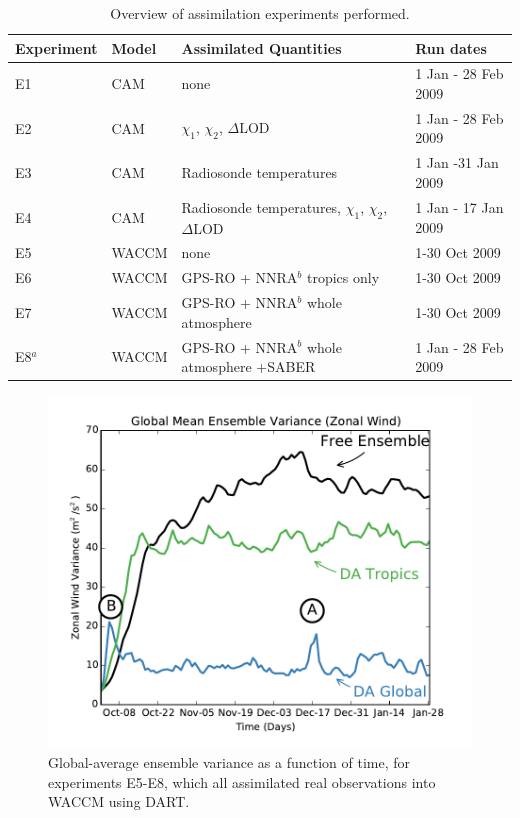 \begin{table}
\caption{Overview of assimilation experiments performed.}
\centering
\begin{tabular}{p{2cm}p{2cm}p{6cm}p{4cm}}
	Experiment& Model &  Assimilated Quantities  & Run dates \\
\hline
E1 & CAM	&	none &  1 Jan - 28 Feb 2009 \\
E2 & CAM &	$\chi_1$, $\chi_2$, $\Delta$LOD	& 1 Jan - 28 Feb 2009 \\
E3 & CAM &	Radiosonde temperatures	& 1 Jan -31 Jan 2009	\\
E4 & CAM &	Radiosonde temperatures, $\chi_1$, $\chi_2$, $\Delta$LOD	& 1 Jan - 17 Jan 2009\\
E5 & WACCM &	none   & 1-30 Oct 2009	\\
E6 & WACCM &	GPS-RO + NNRA$^b$ tropics only & 1-30 Oct 2009	\\
E7 & WACCM &	GPS-RO + NNRA$^b$ whole atmosphere  & 1-30 Oct 2009	\\
E8$^a$ & WACCM &	GPS-RO + NNRA$^b$ whole atmosphere +SABER & 1 Jan - 28 Feb 2009\\	
\hline
\end{tabular}
\label{tab:expts}
\end{table}
\clearpage

 \begin{figure}
	 \includegraphics[width=\textwidth]{Paper_figures/ERPDA_paper_evalvariable_state_space.pdf}
	 \caption{Global-average ensemble variance as a function of time, for experiments E5-E8, which all assimilated real observations into WACCM using DART.}
	 \label{fig:evalvariable_state}
\end{figure}

